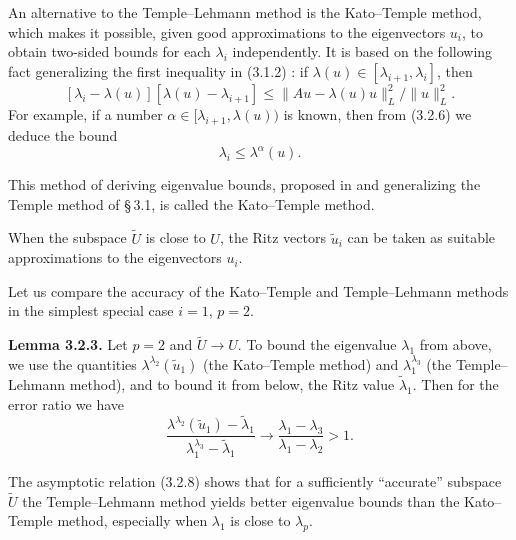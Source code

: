 \documentclass[11pt,oneside]{book}
\begin{document}
An alternative to the Temple--Lehmann method is the Kato--Temple method, which makes it possible, given good approximations to the eigenvectors $u_i$, to obtain two-sided bounds for each $\lambda_i$ independently. It is based on the following fact generalizing the first inequality in (3.1.2) \citep{Kato1949,Chatelin1983,Parlett1983}: if $\lambda(u) \in [\lambda_{i+1}, \lambda_i]$, then %
\[
[\lambda_i - \lambda(u)][\lambda(u) - \lambda_{i+1}] \leqslant \|Au - \lambda(u)u\|_L^2 / \|u\|_L^2.
\tag{3.2.6}
\]
For example, if a number $\alpha \in [\lambda_{i+1}, \lambda(u))$ is known, then from (3.2.6) we deduce the bound
\[
\lambda_i \leqslant \lambda^\alpha(u).
\tag{3.2.7}
\]

This method of deriving eigenvalue bounds, proposed in \citep{Kato1949} and generalizing the Temple method of \S\,3.1, is called the Kato--Temple method.

When the subspace $\widetilde{U}$ is close to $U$, the Ritz vectors $\tilde{u}_i$ can be taken as suitable approximations to the eigenvectors $u_i$.

Let us compare the accuracy of the Kato--Temple and Temple--Lehmann methods in the simplest special case $i = 1$, $p = 2$.

\textbf{Lemma 3.2.3.} Let $p = 2$ and $\widetilde{U} \to U$. To bound the eigenvalue $\lambda_1$ from above, we use the quantities $\lambda^{\lambda_2}(\tilde{u}_1)$ (the Kato--Temple method) and $\lambda_1^{\lambda_3}$ (the Temple--Lehmann method), and to bound it from below, the Ritz value $\tilde{\lambda}_1$. Then for the error ratio we have
\[
\frac{\lambda^{\lambda_2}(\tilde{u}_1) - \tilde{\lambda}_1}{\lambda_1^{\lambda_3} - \tilde{\lambda}_1} \longrightarrow \frac{\lambda_1 - \lambda_3}{\lambda_1 - \lambda_2} > 1.
\tag{3.2.8}
\]

The asymptotic relation (3.2.8) shows that for a sufficiently ``accurate'' subspace $\widetilde{U}$ the Temple--Lehmann method yields better eigenvalue bounds than the Kato--Temple method, especially when $\lambda_1$ is close to $\lambda_p$.
\end{document}
